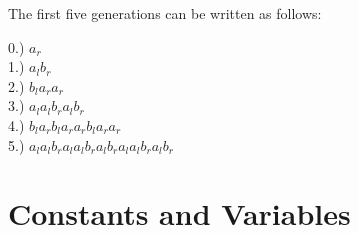 \begin{flushleft}
\vspace{5mm}

The first five generations can be written as follows: \\

\vspace{5mm}

0.) $a_r$ \\
1.) $a_l b_r$ \\
2.) $b_l a_r a_r$ \\
3.) $a_l a_l b_r a_l b_r$ \\
4.) $b_l a_r b_l a_r a_r b_l a_r a_r$ \\
5.) $a_l a_l b_r a_l a_l b_r a_l b_r a_l a_l b_r a_l b_r$ \\

\vspace{5mm}



\end{flushleft}

\section{Constants and Variables}

